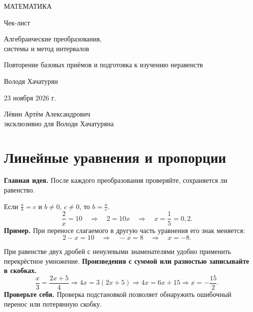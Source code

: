 \documentclass[a4paper,12pt]{article}
\newcommand{\idea}[1]{\textcolor{darkaccent}{\textbf{Главная идея.}} #1}
\newcommand{\attention}[1]{\textcolor{darkaccent}{\textbf{Проверьте себя.}} #1}
\newcommand{\ex}[1]{\textcolor{darkaccent}{\textbf{Пример.}} #1}
\begin{document}
\thispagestyle{empty}
\vspace*{31mm}
\begin{center}
{\large\color{darkaccent} МАТЕМАТИКА}\par
\vspace{17mm}
{\LARGE Чек-лист}\par
\vspace{11mm}
{\LARGE\color{accent} Алгебраические преобразования,\\[2mm] системы и метод интервалов}\par
\vspace{13mm}
{\normalsize Повторение базовых приёмов и подготовка к изучению неравенств}\par
\vspace{32mm}
{\large Володя Хачатурян}\par
\vspace{13mm}
{\normalsize 23 ноября 2026 г.}\par
\vfill
{\small Лёвин Артём Александрович\\ эксклюзивно для Володи Хачатуряна}\par
\vspace{18mm}
\end{center}
\clearpage

\section{Линейные уравнения и пропорции}
\idea{После каждого преобразования проверяйте, сохраняется ли равенство.}

Если \(\frac{a}{b}=c\) и \(b\ne0\), \(c\ne0\), то \(b=\frac{a}{c}\).
\[
\frac{2}{x}=10\quad\Longrightarrow\quad 2=10x
\quad\Longrightarrow\quad x=\frac15=0{,}2.
\]
\ex{При переносе слагаемого в другую часть уравнения его знак меняется:}
\[
2-x=10\quad\Longrightarrow\quad -x=8\quad\Longrightarrow\quad x=-8.
\]

При равенстве двух дробей с ненулевыми знаменателями удобно применить перекрёстное умножение. \textbf{Произведения с суммой или разностью записывайте в скобках.}
\[
\frac{x}{3}=\frac{2x+5}{4}
\Longrightarrow 4x=3(2x+5)
\Longrightarrow 4x=6x+15
\Longrightarrow x=-\frac{15}{2}.
\]
\attention{Проверка подстановкой позволяет обнаружить ошибочный перенос или потерянную скобку.}
\end{document}
